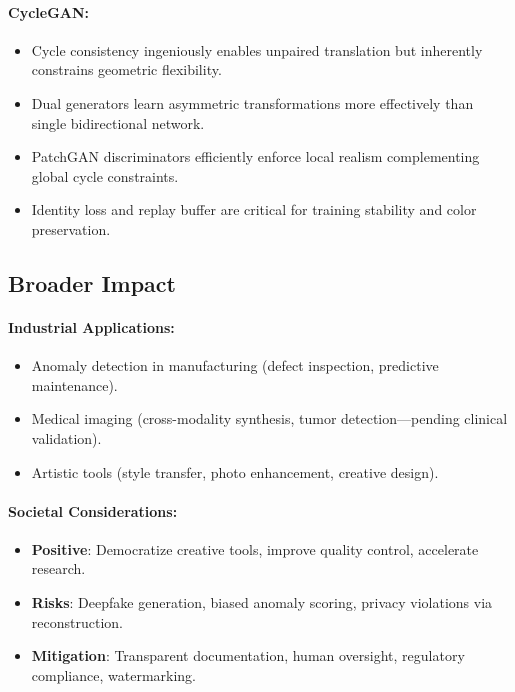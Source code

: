 \documentclass[11pt]{article}
\begin{document}
\paragraph{CycleGAN:}
\begin{itemize}
\item Cycle consistency ingeniously enables unpaired translation but inherently constrains geometric flexibility.
\item Dual generators learn asymmetric transformations more effectively than single bidirectional network.
\item PatchGAN discriminators efficiently enforce local realism complementing global cycle constraints.
\item Identity loss and replay buffer are critical for training stability and color preservation.
\end{itemize}

\subsection{Broader Impact}
\paragraph{Industrial Applications:}
\begin{itemize}
\item Anomaly detection in manufacturing (defect inspection, predictive maintenance).
\item Medical imaging (cross-modality synthesis, tumor detection—pending clinical validation).
\item Artistic tools (style transfer, photo enhancement, creative design).
\end{itemize}

\paragraph{Societal Considerations:}
\begin{itemize}
\item \textbf{Positive}: Democratize creative tools, improve quality control, accelerate research.
\item \textbf{Risks}: Deepfake generation, biased anomaly scoring, privacy violations via reconstruction.
\item \textbf{Mitigation}: Transparent documentation, human oversight, regulatory compliance, watermarking.
\end{itemize}
\end{document}
